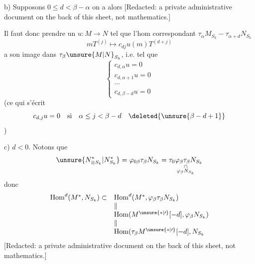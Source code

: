 b) Supposons $0\leq d<\beta-\alpha$  on a alors
[Redacted: a private administrative document on the back of this sheet, not mathematics.]


Il faut donc prendre un $u:M\longrightarrow N$ tel que l'hom correspondant $\tau_\alpha M_{S_k}-\tau_{\alpha+d}N_{S_k}$
\[
mT^{(j)}\longmapsto c_{dj}u(m)T^{(d+j)}
\]
 a son image dans $\tau_\beta\unsure{M|N}_{S_k}$, i.e. tel que
\[
\left\{\begin{array}{l}
c_{d,\alpha}u=0\\
c_{d,\alpha+1}u=0\\
\cdots\\
c_{d,\beta-d}u=0
\end{array}\right.
\]
(ce qui s'écrit
\[
c_{d,j}u=0\quad\text{si}\quad\alpha\leq j<\beta-d\quad\deleted{\unsure{\beta-d+1}}
\]
)

c) \uline{$d<0$}. Notons que
\[
\unsure{N^*_{\otimes S_k}|N^*_{S_k}}=\varphi_{0\beta}\tau_\beta N_{S_k}=\underset{\substack{\cap\\\varphi_\beta N_{S_k}}}{\tau_0\varphi_\beta\tau_\beta N_{S_k}}
\]
donc 
\[
\begin{array}{ll}
\operatorname{Hom}^d(M^*,N_{S_k})\subset & \operatorname{Hom}^d(M^*,\varphi_\beta\tau_\beta N_{S_k})\\
& \Vert\\
& \operatorname{Hom}(M^{\unsure{*|\prime}}[-d],\varphi_\beta N_{S_k})\\
& \Vert\\
& \operatorname{Hom}(\tau_\beta M^{\unsure{*|\prime}}[-d],N_{S_k}
\end{array}
\]
[Redacted: a private administrative document on the back of this sheet, not mathematics.]

